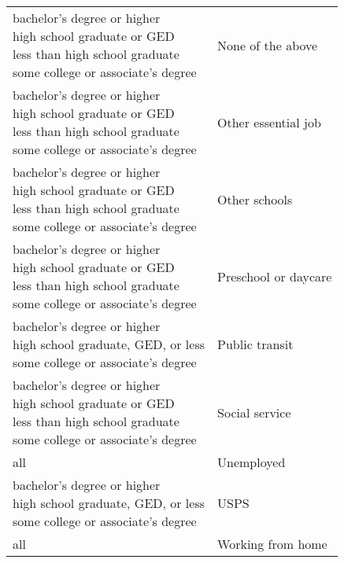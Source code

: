 \begin{table}
\begin{tabular}[t]{ll}
\cmidrule{1-2}
\makecell[l]{bachelor's degree or higher\\high school graduate or GED\\less than high school graduate\\some college or associate's degree} & None of the above\\
\cmidrule{1-2}
\makecell[c]{bachelor's degree or higher\\high school graduate or GED\\less than high school graduate\\some college or associate's degree} & Other essential job\\
\cmidrule{1-2}
\makecell[r]{bachelor's degree or higher\\high school graduate or GED\\less than high school graduate\\some college or associate's degree} & Other schools\\
\cmidrule{1-2}
\makecell[l]{bachelor's degree or higher\\high school graduate or GED\\less than high school graduate\\some college or associate's degree} & Preschool or daycare\\
\cmidrule{1-2}
\makecell[c]{bachelor's degree or higher\\high school graduate, GED, or less\\some college or associate's degree} & Public transit\\
\cmidrule{1-2}
\makecell[r]{bachelor's degree or higher\\high school graduate or GED\\less than high school graduate\\some college or associate's degree} & Social service\\
\cmidrule{1-2}
all & Unemployed\\
\cmidrule{1-2}
\makecell[c]{bachelor's degree or higher\\high school graduate, GED, or less\\some college or associate's degree} & USPS\\
\cmidrule{1-2}
all & Working from home\\
\bottomrule
\end{tabular}
\end{table}
